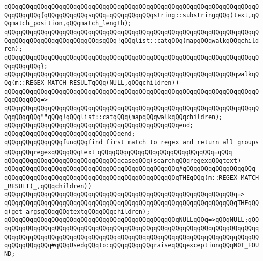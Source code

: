 \verb|qQQqqQQqqQQqqQQqqQQqqQQqqQQqqQQqqQQqqQQqqQQqqQQqqQQqqQQqqQQqqQQqqQQqqQQqqQQqqQQq{qQQqqQQqqQQqsqQQq=qQQqqQQqqQQqstring::substringqQQq(text,qQQqmatch_position,qQQqmatch_length);|\newline
\verb|qQQqqQQqqQQqqQQqqQQqqQQqqQQqqQQqqQQqqQQqqQQqqQQqqQQqqQQqqQQqqQQqqQQqqQQqqQQqqQQqqQQqqQQqqQQqqQQqsqQQq!qQQqlist::catqQQq(mapqQQqwalkqQQqchildren);|\newline
\verb|qQQqqQQqqQQqqQQqqQQqqQQqqQQqqQQqqQQqqQQqqQQqqQQqqQQqqQQqqQQqqQQqqQQqqQQqqQQqqQQq};|\newline
\newline
\verb|qQQqqQQqqQQqqQQqqQQqqQQqqQQqqQQqqQQqqQQqqQQqqQQqqQQqqQQqqQQqqQQqwalkqQQq(m::REGEX_MATCH_RESULTqQQq(NULL,qQQqchildren))|\newline
\verb|qQQqqQQqqQQqqQQqqQQqqQQqqQQqqQQqqQQqqQQqqQQqqQQqqQQqqQQqqQQqqQQqqQQqqQQqqQQqqQQq=>|\newline
\verb|qQQqqQQqqQQqqQQqqQQqqQQqqQQqqQQqqQQqqQQqqQQqqQQqqQQqqQQqqQQqqQQqqQQqqQQqqQQqqQQq""qQQq!qQQqlist::catqQQq(mapqQQqwalkqQQqchildren);|\newline
\verb|qQQqqQQqqQQqqQQqqQQqqQQqqQQqqQQqqQQqqQQqqQQqqQQqend;|\newline
\newline
\verb|qQQqqQQqqQQqqQQqqQQqqQQqqQQqqQQqend;|\newline
\newline
\newline
\verb|qQQqqQQqqQQqqQQqfunqQQqfind_first_match_to_regex_and_return_all_groupsqQQqqQQqregexqQQqqQQqtext|\newline
\verb|qQQqqQQqqQQqqQQqqQQqqQQqqQQqqQQq=qQQq|\newline
\verb|qQQqqQQqqQQqqQQqqQQqqQQqqQQqqQQqcaseqQQq(searchqQQqregexqQQqtext)|\newline
\verb|qQQqqQQqqQQqqQQqqQQqqQQqqQQqqQQqqQQqqQQqqQQqqQQq#qQQqqQQqqQQqqQQqqQQq|\newline
\verb|qQQqqQQqqQQqqQQqqQQqqQQqqQQqqQQqqQQqqQQqqQQqqQQqTHEqQQq(m::REGEX_MATCH_RESULT(_,qQQqchildren))|\newline
\verb|qQQqqQQqqQQqqQQqqQQqqQQqqQQqqQQqqQQqqQQqqQQqqQQqqQQqqQQqqQQqqQQq=>|\newline
\verb|qQQqqQQqqQQqqQQqqQQqqQQqqQQqqQQqqQQqqQQqqQQqqQQqqQQqqQQqqQQqqQQqTHEqQQq(get_argsqQQqqQQqtextqQQqqQQqchildren);|\newline
\newline
\verb|qQQqqQQqqQQqqQQqqQQqqQQqqQQqqQQqqQQqqQQqqQQqqQQqNULLqQQq=>qQQqNULL;qQQqqQQqqQQqqQQqqQQqqQQqqQQqqQQqqQQqqQQqqQQqqQQqqQQqqQQqqQQqqQQqqQQqqQQqqQQqqQQqqQQqqQQqqQQqqQQqqQQqqQQqqQQqqQQqqQQqqQQqqQQqqQQqqQQqqQQqqQQqqQQqqQQqqQQqqQQq#qQQqUsedqQQqto:qQQqqQQqqQQqraiseqQQqexceptionqQQqNOT_FOUND;|\newline
